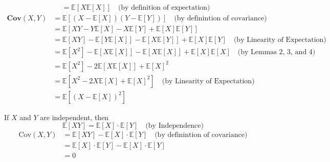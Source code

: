 \documentclass{article}
\begin{document}
\begin{aprob}
\begin{tcolorbox}[colback=lightgray!10!white, colframe=black, title=A2.a]
\begin{align*}
        &= \mathbb{E}[X\mathbb{E}[X]] \quad \text{(by definition of expectation)}
        \end{align*}
        \begin{align*}
        \textbf{Cov}(X, Y) &= \mathbb{E}[(X - \mathbb{E}[X])(Y - \mathbb{E}[Y])] \quad \text{(by definintion of covariance)} \\
        &= \mathbb{E}[XY - Y\mathbb{E}[X] - X\mathbb{E}[Y] + \mathbb{E}[X]\mathbb{E}[Y]] \\
        &= \mathbb{E}[XY] - \mathbb{E}[Y\mathbb{E}[X]] - \mathbb{E}[X\mathbb{E}[Y]] + \mathbb{E}[X]\mathbb{E}[Y] \quad \text{(by Linearity of Expectation)} \\
        &= \mathbb{E}[X^2] - \mathbb{E}[X\mathbb{E}[X]] - \mathbb{E}[X\mathbb{E}[X]] + \mathbb{E}[X]\mathbb{E}[X] \quad \text{(by Lemmas 2, 3, and 4)} \\
        &= \mathbb{E}[X^2] - 2\mathbb{E}[X\mathbb{E}[X]] + \mathbb{E}[X]^2 \\
        &= \mathbb{E}[X^2 - 2X\mathbb{E}[X] + \mathbb{E}[X]^2] \quad \text{(by Linearity of Expectation)} \\
        &= \mathbb{E}[(X - \mathbb{E}[X])^2]
        \end{align*}
        \end{tcolorbox}
        \begin{tcolorbox}[colback=lightgray!10!white, colframe=black, title=A2.b]
        If $X$ and $Y$ are independent, then
        \[
        \mathbb{E}[XY] = \mathbb{E}[X] \cdot \mathbb{E}[Y] \quad \text{(by Independence)}
        \]
        \begin{align*}
        \text{Cov}(X,Y) &= \mathbb{E}[XY] - \mathbb{E}[X] \cdot \mathbb{E}[Y] \quad \text{(by definintion of covariance)}\\
        &= \mathbb{E}[X] \cdot \mathbb{E}[Y] - \mathbb{E}[X] \cdot \mathbb{E}[Y] \\
        &= 0
        \end{align*}
        \end{tcolorbox}
\end{aprob}
\end{document}
